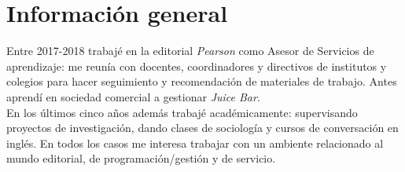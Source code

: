 \documentclass[a4paper,hidelinks]{twentysecondcv} %
\begin{document}
\begin{twenty} %
\end{twenty}


\section{Información general}


Entre 2017-2018 trabajé en la editorial \textit{Pearson} como Asesor de Servicios de aprendizaje: me reunía con docentes, coordinadores y directivos de institutos y colegios para hacer seguimiento y recomendación de materiales de trabajo. 
Antes aprendí en sociedad comercial a gestionar \textit{Juice Bar}.
\\
En los últimos cinco años además trabajé académicamente: supervisando proyectos de investigación, dando clases de sociología y cursos de conversación en inglés. En todos los casos me interesa trabajar con un ambiente relacionado al mundo editorial, de programación/gestión y de servicio.

\end{document}

